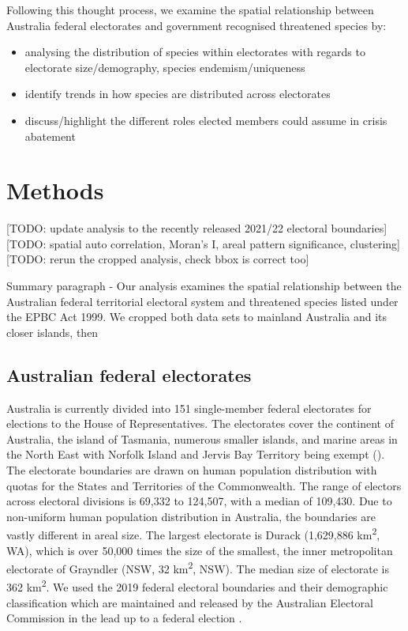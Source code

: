 \documentclass[a4paper,11pt]{article}
\begin{document}
Following this thought process, we examine the spatial relationship between Australia federal electorates and government recognised threatened species by:
\begin{itemize}
    \item analysing the distribution of species within electorates with regards to electorate size/demography, species endemism/uniqueness
    \item identify trends in how species are distributed across electorates
    \item discuss/highlight the different roles elected members could assume in crisis abatement
\end{itemize}

\section{Methods}
[TODO: update analysis to the recently released 2021/22 electoral boundaries]
[TODO: spatial auto correlation, Moran's I, areal pattern significance, clustering]
[TODO: rerun the cropped analysis, check bbox is correct too]

Summary paragraph - Our analysis examines the spatial relationship between the Australian federal territorial electoral system and threatened species listed under the EPBC Act 1999. We cropped both data sets to mainland Australia and its closer islands, then 

\subsection{Australian federal electorates}

Australia is currently divided into 151 single-member federal electorates for elections to the House of Representatives. The electorates cover the continent of Australia, the island of Tasmania, numerous smaller islands, and marine areas in the North East with Norfolk Island and Jervis Bay Territory being exempt (\cite{parliamentofaustraliaElectoralDivisions2018}). The electorate boundaries are drawn on human population distribution with quotas for the States and Territories of the Commonwealth. The range of electors across electoral divisions is 69,332 to 124,507, with a median of 109,430. Due to non-uniform human population distribution in Australia, the boundaries are vastly different in areal size. The largest electorate is Durack (1,629,886 km\textsuperscript{2}, WA), which is over 50,000 times the size of the smallest, the inner metropolitan electorate of Grayndler (NSW, 32 km\textsuperscript{2}, NSW). The median size of electorate is 362 km\textsuperscript{2}. We used the 2019 federal electoral boundaries and their demographic classification which are maintained and released by the Australian Electoral Commission in the lead up to a federal election \cite{australiaelectoralcomissionFederalElectoralBoundaries2019}. 
\end{document}
